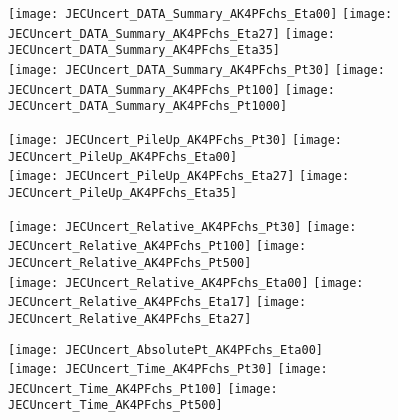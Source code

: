 \documentclass[landscape,10pt]{beamer} %
\begin{document}
\newpage

\begin{figure}[p]
\centering
  \texttt{[image: JECUncert\_DATA\_Summary\_AK4PFchs\_Eta00]}
  \texttt{[image: JECUncert\_DATA\_Summary\_AK4PFchs\_Eta27]}
  \texttt{[image: JECUncert\_DATA\_Summary\_AK4PFchs\_Eta35]}\\
  \texttt{[image: JECUncert\_DATA\_Summary\_AK4PFchs\_Pt30]}
  \texttt{[image: JECUncert\_DATA\_Summary\_AK4PFchs\_Pt100]}
  \texttt{[image: JECUncert\_DATA\_Summary\_AK4PFchs\_Pt1000]}
\end{figure}

\newpage

\begin{figure}[p]
\centering
  \texttt{[image: JECUncert\_PileUp\_AK4PFchs\_Pt30]}
  \texttt{[image: JECUncert\_PileUp\_AK4PFchs\_Eta00]}\\
  \texttt{[image: JECUncert\_PileUp\_AK4PFchs\_Eta27]}
  \texttt{[image: JECUncert\_PileUp\_AK4PFchs\_Eta35]}
\end{figure}

\newpage 

\begin{figure}[p]
\centering
  \texttt{[image: JECUncert\_Relative\_AK4PFchs\_Pt30]}
  \texttt{[image: JECUncert\_Relative\_AK4PFchs\_Pt100]}
  \texttt{[image: JECUncert\_Relative\_AK4PFchs\_Pt500]}\\
  \texttt{[image: JECUncert\_Relative\_AK4PFchs\_Eta00]}
  \texttt{[image: JECUncert\_Relative\_AK4PFchs\_Eta17]}
  \texttt{[image: JECUncert\_Relative\_AK4PFchs\_Eta27]}
\end{figure}

\newpage

\begin{figure}[p]
\centering
  \texttt{[image: JECUncert\_AbsolutePt\_AK4PFchs\_Eta00]}\\
  \texttt{[image: JECUncert\_Time\_AK4PFchs\_Pt30]}
  \texttt{[image: JECUncert\_Time\_AK4PFchs\_Pt100]}
  \texttt{[image: JECUncert\_Time\_AK4PFchs\_Pt500]}
\end{figure}
\end{document}

